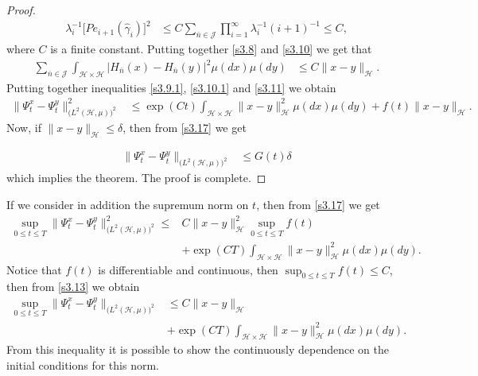 \documentclass[review, onefignum, onetabnum]{siamart171218}
\begin{document}
\begin{proof}
\begin{align}
  \lambda_i^{-1} \Big[Pe_{i+1}(\hat \gamma_i)\Big]^2 & \le C \sum_{\bar n\in
    \mathcal{J}}  \prod_{i=1}^\infty
  \lambda_i^{-1}(i+1)^{-1}
  \le C,
\end{align}
where $C$ is a finite constant. Putting together \eqref{s3.8} and
\eqref{s3.10} we get that
\begin{align}
  \sum_{\bar n\in \mathcal{J}} \int_{\mathcal{H}\times \mathcal{H}}  \big|
  H_{\bar n}(x) -H_{\bar n}(y) \big|^2 \mu(dx)\mu(dy) &\le
  C \| x-y\|_{\mathcal{H}}. \label{s3.11}
\end{align}
Putting together inequalities \eqref{s3.9.1}, \eqref{s3.10.1} and
\eqref{s3.11} we obtain
\begin{align}
  \| \Psi_t^x-\Psi_t^y\|_{\big(L^2(\mathcal{H},\mu) \big)^2}^2&\le   \exp(Ct)
  \int_{\mathcal{H}\times \mathcal{H}}
  \| x-y\|_{\mathcal{H}}^2 \mu(dx)\mu(dy) +  f(t)\| x-y\|_{\mathcal{H}}.
  \label{s3.17}
\end{align}
Now, if $\| x-y\|_{\mathcal{H}}\le \delta $, then from \eqref{s3.17} we get

\begin{align}
 \| \Psi_t^x-\Psi_t^y\|_{\big(L^2(\mathcal{H},\mu) \big)^2} &\le
  G(t) \delta  \label{s3.12}
\end{align}
which implies the theorem. The proof is complete.
\end{proof}

\begin{remark}
    If we consider in addition the supremum norm on $t$, then from
    \eqref{s3.17} we get
    \begin{equation}
        \label{s3.13}
        \begin{aligned}
            \sup_{0\le t\le T}\| \Psi_t^x-\Psi_t^y\|_{
                \big(L^2(\mathcal{H},\mu) \big)^2} ^ 2
                \le&
                 C \| x-y\|_{\mathcal{H}}^2
                 \sup_{0\le t\le T} f(t)
                 \\
                 &+
                \exp(CT)
                \int_{\mathcal{H}\times \mathcal{H}}
                \|x-y\|_{\mathcal{H}}^2 \mu(dx)\mu(dy).
        \end{aligned}
    \end{equation}
    Notice that $f(t)$ is differentiable and continuous, then
    $\sup_{0\le t\le T} f(t)\le C$, then from \eqref{s3.13} we obtain
    \begin{equation}
        \label{s3.14}
        \begin{aligned}
            \sup_{0\le t\le T}
            \|
                \Psi_t^x-\Psi_t^y
            \|_{\big(L^2(\mathcal{H},\mu)\big)^2}
            &\le
            C \| x-y\|_{\mathcal{H}}
            \\
            & +
            \exp(CT)
            \int_{\mathcal{H}\times \mathcal{H}}
            \| x-y\|_{\mathcal{H}}^2 \mu(dx)\mu(dy).
        \end{aligned}
    \end{equation}
    From this inequality it is possible to show the continuously dependence on
    the initial conditions for this norm.
\end{remark}
\end{document}
